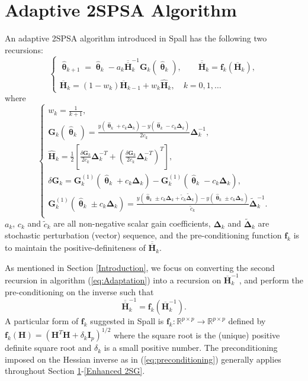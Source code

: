 \documentclass[conference]{IEEEtran}
\newcommand{\bG}{\bm{G}}
\newcommand{\bDelta}{\bm{\Delta}}
\newcommand{\oH}{\bm{\overline{H}}}
\newcommand{\ooH}{\bm{\overline{\overline{H}}}}
\newcommand{\hH}{\bm{\hat{H}}}
\newcommand{\htheta}{\bm{\hat{\uptheta}}}
\newcommand{\tDelta}{\bm{\tilde{\Delta}}}
\begin{document}
	
	
	\section{Adaptive 2SPSA Algorithm} \label{2SPSA}
	An adaptive 2SPSA algorithm introduced in Spall \cite{Spall2000} has the following two recursions:
	\begin{equation} \label{eq:Adaptation}
		\begin{cases}
			\htheta_{k+1}=\htheta_k-a_k\ooH_k^{-1} \bG_k(\htheta_k),\qquad \bm{\ooH}_k=\bm{f}_k(\oH_k),\\
			\oH_k= (1 - w_k) \oH_{k-1}+ w_k \hH_k, \quad k=0,1,\dots
		\end{cases}
	\end{equation}
	where
	\begin{equation} \label{eq:notations}
		\begin{cases}
			w_k=\frac{1}{k+1},\\
			\bG_k(\htheta_k)=\frac{y(\htheta_k+c_k\bDelta_k)-y(\htheta_k-c_k\bDelta_k)}{2c_k}\bDelta_k^{-1},\\
			\hH_k=\frac{1}{2}\left[ \frac{\delta\bG_k}{2c_k}\bDelta_k^{-T}+\left(\frac{\delta\bG_k}{2c_k}\bDelta_k^{-T}\right)^T \right],\\
			\delta\bG_k=\bG_k^{(1)}(\htheta_k+ c_k\bDelta_k)-\bG_k^{(1)}(\htheta_k- c_k\bDelta_k),\\
			\bG_k^{(1)}(\htheta_k\pm c_k\bDelta_k)
			=\frac{y(\htheta_k\pm c_k\bDelta_k+\tilde{c}_k\tDelta_k)-y(\htheta_k\pm c_k\bDelta_k)}{\tilde{c}_k}\tDelta_k^{-1}.\\
		\end{cases}
	\end{equation}
	$ a_k $, $ c_k $ and $ \tilde{c}_k $ are all non-negative scalar gain coefficients, $ \bDelta_k $ and $ \tDelta_k $ are stochastic perturbation (vector) sequence, and the pre-conditioning function $ \bm{f}_k $ is to maintain the positive-definiteness of $ \ooH_k $.
	
	As mentioned in Section \ref{Introduction}, we focus on converting the second recursion in algorithm (\ref{eq:Adaptation}) into a recursion on $\oH_k^{-1}$, and perform the pre-conditioning on the inverse such that
	\begin{equation} \label{eq:preconditioning}
	\bm{\ooH}_k^{-1}=\bm{f}_k(\oH_k^{-1}).
	\end{equation}
	A particular form of $\bm{f}_k$ suggested in Spall \cite{Spall2009} is $\bm{f}_k: \mathbb{R}^{p\times p} \to \mathbb{R}^{p\times p}$ defined by $\bm{f}_k(\bm{H})=(\bm{H}^{T}\bm{H}+\delta_k \bm{I}_p)^{1/2}$ where the square root is the (unique) positive definite square root and $\delta_k$ is a small positive number. The preconditioning imposed on the Hessian inverse as in (\ref{eq:preconditioning}) generally applies throughout Section \ref{2SPSA}-\ref{Enhanced 2SG}.
	
\end{document}
